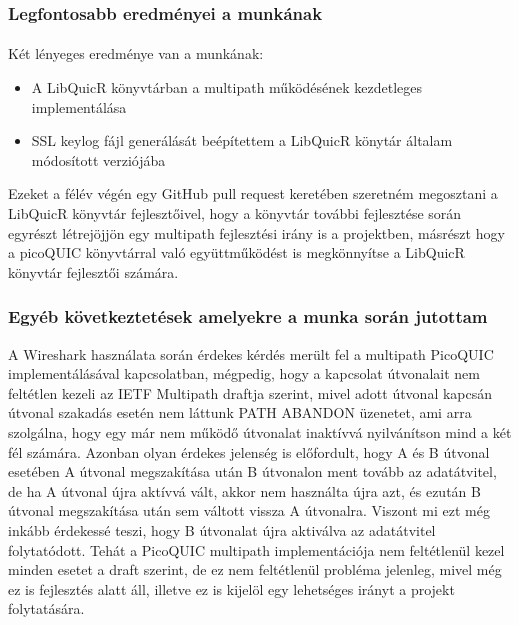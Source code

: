 \documentclass[a4paper,oneside]{article}
\begin{document}
\subsubsection{Legfontosabb eredményei a munkának}
\paragraph{}

Két lényeges eredménye van a munkának:
\begin{itemize}
  \item A LibQuicR könyvtárban a multipath működésének kezdetleges implementálása
  \item SSL keylog fájl generálását beépítettem a LibQuicR könytár általam módosított verziójába
\end{itemize}
Ezeket a félév végén egy GitHub pull request keretében szeretném megosztani a LibQuicR könyvtár fejlesztőivel,
hogy a könyvtár további fejlesztése során egyrészt létrejöjjön egy multipath fejlesztési irány is a projektben, másrészt hogy
a picoQUIC könyvtárral való együttműködést is megkönnyítse a LibQuicR könyvtár fejlesztői számára.

\subsubsection{Egyéb következtetések amelyekre a munka során jutottam}

A Wireshark használata során érdekes kérdés merült fel a multipath PicoQUIC implementálásával kapcsolatban,
mégpedig, hogy a kapcsolat útvonalait nem feltétlen kezeli az IETF Multipath draftja szerint, mivel adott útvonal kapcsán útvonal szakadás 
esetén nem láttunk PATH ABANDON üzenetet, ami arra szolgálna, hogy egy már nem működő útvonalat inaktívvá nyilvánítson mind a két fél számára.
Azonban olyan érdekes jelenség is előfordult, hogy A és B útvonal esetében A útvonal megszakítása után B útvonalon ment tovább az adatátvitel,
de ha A útvonal újra aktívvá vált, akkor nem használta újra azt, és ezután B útvonal megszakítása után sem váltott vissza A útvonalra. Viszont mi ezt még inkább
érdekessé teszi, hogy B útvonalat újra aktiválva az adatátvitel folytatódott. Tehát a PicoQUIC multipath implementációja nem feltétlenül
kezel minden esetet a draft szerint, de ez nem feltétlenül probléma jelenleg, mivel még ez is fejlesztés alatt áll, illetve ez is kijelöl egy lehetséges 
irányt a projekt folytatására.


\newpage
 
\end{document}
